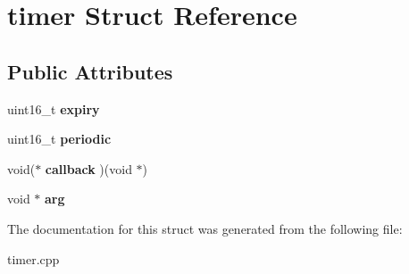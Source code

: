 \hypertarget{structtimer}{}\section{timer Struct Reference}
\label{structtimer}
\subsection*{Public Attributes}
\begin{DoxyCompactItemize}
\item 
\mbox{\label{structtimer_abf7c48c5f45136fcdf61b589ed812c17}} 
uint16\+\_\+t {\bfseries expiry}
\item 
\mbox{\label{structtimer_ab74938b57c1754ffc408bacb8d1648e7}} 
uint16\+\_\+t {\bfseries periodic}
\item 
\mbox{\label{structtimer_ad89f76999d3eac08084effd57ed4413d}} 
void($\ast$ {\bfseries callback} )(void $\ast$)
\item 
\mbox{\label{structtimer_a03e3376ceb13607b057344233812205a}} 
void $\ast$ {\bfseries arg}
\end{DoxyCompactItemize}


The documentation for this struct was generated from the following file\+:\begin{DoxyCompactItemize}
\item 
timer.\+cpp\end{DoxyCompactItemize}
